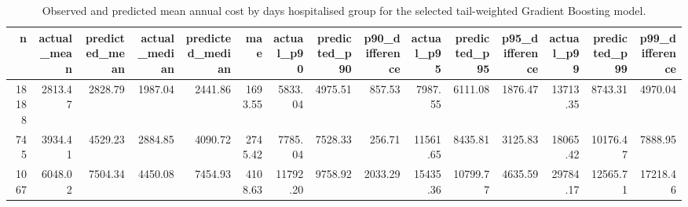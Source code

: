 \begin{table}
\caption{Observed and predicted mean annual cost by days hospitalised group for the selected tail-weighted Gradient Boosting model.}
\label{tab:06-selected-mean-group-summary-days-hospitalised}
\begin{tabular}{rrrrrrrrrrrrrrr}
\toprule
n & actual_mean & predicted_mean & actual_median & predicted_median & mae & actual_p90 & predicted_p90 & p90_difference & actual_p95 & predicted_p95 & p95_difference & actual_p99 & predicted_p99 & p99_difference \\
\midrule
18188 & 2813.47 & 2828.79 & 1987.04 & 2441.86 & 1693.55 & 5833.04 & 4975.51 & 857.53 & 7987.55 & 6111.08 & 1876.47 & 13713.35 & 8743.31 & 4970.04 \\
745 & 3934.41 & 4529.23 & 2884.85 & 4090.72 & 2745.42 & 7785.04 & 7528.33 & 256.71 & 11561.65 & 8435.81 & 3125.83 & 18065.42 & 10176.47 & 7888.95 \\
1067 & 6048.02 & 7504.34 & 4450.08 & 7454.93 & 4108.63 & 11792.20 & 9758.92 & 2033.29 & 15435.36 & 10799.77 & 4635.59 & 29784.17 & 12565.71 & 17218.46 \\
\bottomrule
\end{tabular}
\end{table}
